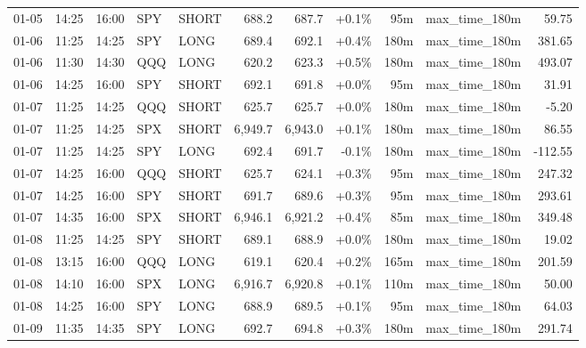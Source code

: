 \documentclass[11pt,a4paper,twoside]{article}
\begin{document}
\begin{center}
\begin{longtable}{>{\color{txtmain}}l l l l l r r r r >{\color{txtmain}}l r}
01-05 & 14:25 & 16:00 & SPY & SHORT & 688.2 & 687.7 & \textcolor{wingreen}{+0.1\%} & 95m & max\_time\_180m & \textcolor{wingreen}{59.75} \\
01-06 & 11:25 & 14:25 & SPY & LONG & 689.4 & 692.1 & \textcolor{wingreen}{+0.4\%} & 180m & max\_time\_180m & \textcolor{wingreen}{381.65} \\
01-06 & 11:30 & 14:30 & QQQ & LONG & 620.2 & 623.3 & \textcolor{wingreen}{+0.5\%} & 180m & max\_time\_180m & \textcolor{wingreen}{493.07} \\
01-06 & 14:25 & 16:00 & SPY & SHORT & 692.1 & 691.8 & \textcolor{wingreen}{+0.0\%} & 95m & max\_time\_180m & \textcolor{wingreen}{31.91} \\
01-07 & 11:25 & 14:25 & QQQ & SHORT & 625.7 & 625.7 & \textcolor{wingreen}{+0.0\%} & 180m & max\_time\_180m & \textcolor{lossred}{-5.20} \\
01-07 & 11:25 & 14:25 & SPX & SHORT & 6,949.7 & 6,943.0 & \textcolor{wingreen}{+0.1\%} & 180m & max\_time\_180m & \textcolor{wingreen}{86.55} \\
01-07 & 11:25 & 14:25 & SPY & LONG & 692.4 & 691.7 & \textcolor{lossred}{-0.1\%} & 180m & max\_time\_180m & \textcolor{lossred}{-112.55} \\
01-07 & 14:25 & 16:00 & QQQ & SHORT & 625.7 & 624.1 & \textcolor{wingreen}{+0.3\%} & 95m & max\_time\_180m & \textcolor{wingreen}{247.32} \\
01-07 & 14:25 & 16:00 & SPY & SHORT & 691.7 & 689.6 & \textcolor{wingreen}{+0.3\%} & 95m & max\_time\_180m & \textcolor{wingreen}{293.61} \\
01-07 & 14:35 & 16:00 & SPX & SHORT & 6,946.1 & 6,921.2 & \textcolor{wingreen}{+0.4\%} & 85m & max\_time\_180m & \textcolor{wingreen}{349.48} \\
01-08 & 11:25 & 14:25 & SPY & SHORT & 689.1 & 688.9 & \textcolor{wingreen}{+0.0\%} & 180m & max\_time\_180m & \textcolor{wingreen}{19.02} \\
01-08 & 13:15 & 16:00 & QQQ & LONG & 619.1 & 620.4 & \textcolor{wingreen}{+0.2\%} & 165m & max\_time\_180m & \textcolor{wingreen}{201.59} \\
01-08 & 14:10 & 16:00 & SPX & LONG & 6,916.7 & 6,920.8 & \textcolor{wingreen}{+0.1\%} & 110m & max\_time\_180m & \textcolor{wingreen}{50.00} \\
01-08 & 14:25 & 16:00 & SPY & LONG & 688.9 & 689.5 & \textcolor{wingreen}{+0.1\%} & 95m & max\_time\_180m & \textcolor{wingreen}{64.03} \\
01-09 & 11:35 & 14:35 & SPY & LONG & 692.7 & 694.8 & \textcolor{wingreen}{+0.3\%} & 180m & max\_time\_180m & \textcolor{wingreen}{291.74} \\

\end{longtable}
\end{center}
\end{document}

